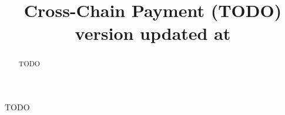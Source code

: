 \documentclass[sigconf, natbib=false]{acmart}
\begin{document}
\title{
    Cross-Chain Payment (TODO) \\
    {\normalsize \normalfont version updated at \DTMnow }
}

\begin{abstract}
TODO
\end{abstract}


\maketitle













\begin{acks}
TODO
\end{acks}

\printbibliography


\end{document}
